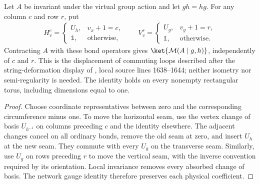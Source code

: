 \begin{lemma}%
    \label{thm:peps_torus_commuting_closure_seams}
    \leanok
    Let $A$ be invariant under the virtual group action and let $gh=hg$.
    For any column $c$ and row $r$, put
    \begin{align}
        H^c_v=\begin{cases}U_h,&v_x+1=c,\\\mathbb 1,&\text{otherwise},\end{cases}
        \qquad
        V^r_v=\begin{cases}U_g,&v_y+1=r,\\\mathbb 1,&\text{otherwise}.\end{cases}
    \end{align}
    Contracting $A$ with these bond operators gives
    $\ket{\mathcal M(A\mid g,h)}$, independently of $c$ and $r$.
    This is the displacement of commuting loops described after
    the string-deformation display of \cite{Schuch2010PEPS}, local source
    lines 1638--1644; neither isometry
    nor semi-regularity is needed. The identity holds on every nonempty
    rectangular torus, including dimensions equal to one.
\end{lemma}

\begin{proof}\leanok
    Choose coordinate representatives between zero and the corresponding
    circumference minus one. To move the horizontal seam, use the vertex
    change of basis $U_{h^{-1}}$ on columns preceding $c$ and the identity
    elsewhere. The adjacent changes cancel on all ordinary bonds, remove
    the old seam at zero, and insert $U_h$ at the new seam. They commute
    with every $U_g$ on the transverse seam. Similarly, use $U_g$ on rows
    preceding $r$ to move the vertical seam, with the inverse convention
    required by its orientation. Local invariance removes every absorbed
    change of basis. The network gauge identity therefore preserves each
    physical coefficient.
\end{proof}

